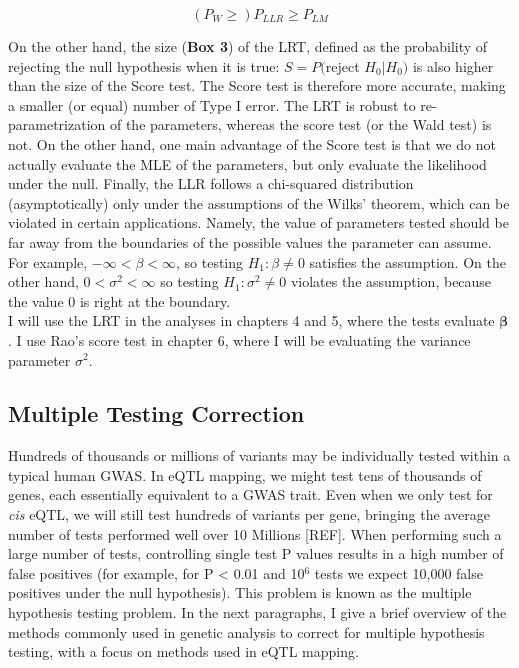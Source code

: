 \begin{equation}
    (P_W \geq) P_{LLR} \geq P_{LM}
\end{equation}

On the other hand, the size (\textbf{Box 3}) of the LRT, defined as the probability of rejecting the null hypothesis when it is true: $S = P($reject $H_0 | H_0)$ is also higher than the size of the Score test.
The Score test is therefore more accurate, making a smaller (or equal) number of Type I error. The LRT is robust to re-parametrization of the parameters, whereas the score test (or the Wald test) is not. On the other hand, one main advantage of the Score test is that we do not actually evaluate the MLE of the parameters, but only evaluate the likelihood under the null.
Finally, the LLR follows a chi-squared distribution (asymptotically) only under the assumptions of the Wilks' theorem, which can be violated in certain applications.
Namely, the value of parameters tested should be far away from the boundaries of the possible values the parameter can assume.
For example, $-\infty < \beta < \infty$, so testing $H_1: \beta \neq 0$ satisfies the assumption.
On the other hand, $0 < \sigma^2 < \infty$ so testing $H_1: \sigma^2 \neq 0$ violates the assumption, because the value $0$ is right at the boundary.\\

I will use the LRT in the analyses in chapters 4 and 5, where the tests evaluate $\boldsymbol{\beta}$.
I use Rao's score test in chapter 6, where I will be evaluating the variance parameter $\sigma^2$.


\subsection{Multiple Testing Correction}

Hundreds of thousands or millions of variants may be individually tested within a typical human GWAS. 
In eQTL mapping, we might test tens of thousands of genes, each essentially equivalent to a GWAS trait. 
Even when we only test for \textit{cis} eQTL, we will still test hundreds of variants per gene, bringing the average number of tests performed well over 10 Millions [REF].  
When performing such a large number of tests, controlling single test P values results in a high number of false positives (for example, for P < 0.01 and 10$^6$ tests we expect 10,000 false positives under the null hypothesis). 
This problem is known as the multiple hypothesis testing problem. 
In the next paragraphs, I give a brief overview of the methods commonly used in genetic analysis to correct for multiple hypothesis testing, with a focus on methods used in eQTL mapping.


